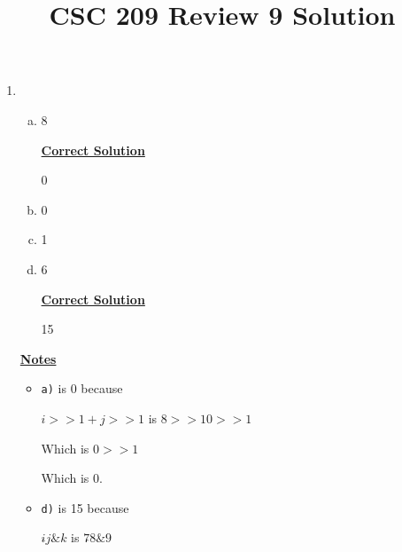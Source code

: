 \documentclass[12pt]{article}
\begin{document}
\title{CSC 209 Review 9 Solution}
\maketitle

\bigskip

\begin{enumerate}[1.]
    \item

    \begin{enumerate}[a)]
        \item 8

        \begin{mdframed}
        \underline{\textbf{Correct Solution}}

        \bigskip

        \color{red}0\color{black}
        \end{mdframed}
        \item 0
        \item 1
        \item 6

        \begin{mdframed}
        \underline{\textbf{Correct Solution}}

        \bigskip

        \color{red}15\color{black}
        \end{mdframed}
    \end{enumerate}

    \bigskip

    \underline{\textbf{Notes}}

    \bigskip

    \begin{itemize}
        \item \texttt{a)} is 0 because

        \bigskip

        $i >> 1 + j >> 1$ is $8 >> 10 >> 1$

        \bigskip

        Which is $0 >> 1$

        \bigskip

        Which is 0.

        \item \texttt{d)} is 15 because

        \bigskip

        $i \hat{} j \& k$ is $7 \hat{} 8 \& 9$

        \bigskip


\end{itemize}
\end{enumerate}
\end{document}
